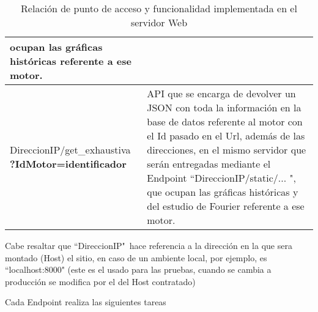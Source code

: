 \begin{table}[ht]
\begin{center}
\begin{tabular}{|p{5cm}|p{10cm}|}
                ocupan las gráficas históricas referente a ese motor.
                \\\hline
                DireccionIP/get\_exhaustiva \textbf{?IdMotor=identificador}&
                API que se encarga de devolver un JSON con toda la información
                en la base de datos referente al motor con el Id pasado en el
                Url, además de las direcciones, en el mismo servidor que serán
                entregadas mediante el Endpoint ``DireccionIP/static/... ", que
                ocupan las gráficas históricas y del estudio de Fourier
                referente a ese motor.
                \\\hline
            \end{tabular}

            \vspace{0.3cm}
            Cabe resaltar que ``DireccionIP"\ hace referencia a la dirección en la
            que sera montado (Host) el sitio, en caso de un ambiente local, por
            ejemplo, es ``localhost:8000" (este es el usado para las pruebas,
            cuando se cambia a producción se modifica por el del Host contratado)
        \end{center}
        \caption[Funciones Servidor Web]{ Relación de punto de acceso y
        funcionalidad implementada en el servidor Web }
        \label{tab:serWeb}
    \end{table}

    Cada Endpoint realiza las siguientes tareas



